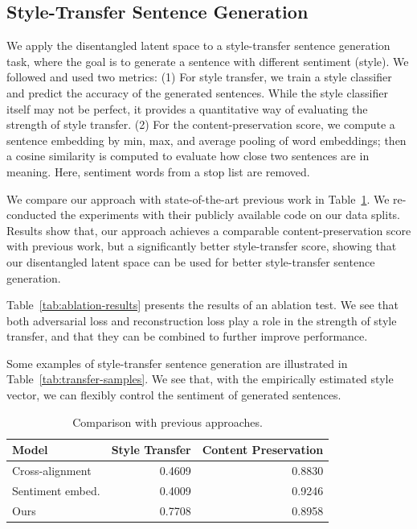 \subsection{Style-Transfer Sentence Generation}

We apply the disentangled latent space to a style-transfer sentence generation task, where the goal is to generate a sentence with different sentiment (style). We followed \cite{fu2017style} and used two metrics: (1) For style transfer, we train a style classifier and predict the accuracy of the generated sentences. While the style classifier itself may not be perfect, it provides a quantitative way of evaluating the strength of style transfer. (2) For the content-preservation score, we compute a sentence embedding by min, max, and average pooling of word embeddings; then a cosine similarity is computed to evaluate how close two sentences are in meaning. Here, sentiment words from a stop list \cite{hu2004mining} are removed.

We compare our approach with state-of-the-art previous work in Table~\ref{tab:comparison-previous}. We re-conducted the experiments with their publicly available code on our data splits.
Results show that, our approach achieves a comparable content-preservation score with previous work, but a significantly better style-transfer score, showing that our disentangled latent space can be used for better style-transfer sentence generation.

Table~\ref{tab:ablation-results} presents the results of an ablation test. We see that both adversarial loss and reconstruction loss play a role in the strength of style transfer, and that they can be combined to further improve performance.

Some examples of style-transfer sentence generation are illustrated in Table~\ref{tab:transfer-samples}. We see that, with the empirically estimated style vector, we can flexibly control the sentiment of generated sentences.

\begin{table}[!t]
	\centering
	\begin{tabular}{| l | r | r | }
		\hline
		\textbf{Model}                       & \textbf{Style Transfer} & \textbf{Content Preservation} \\
		\hline
		\hline
		Cross-alignment \cite{shen2017style} & 0.4609                  & 0.8830                        \\
		\hline
		Sentiment embed. \cite{fu2017style}  & 0.4009                  & 0.9246                        \\
		\hline
		Ours                                 & 0.7708                  & 0.8958                        \\
		\hline
	\end{tabular}
	\caption{Comparison with previous approaches.}
	\label{tab:comparison-previous}
\end{table}

